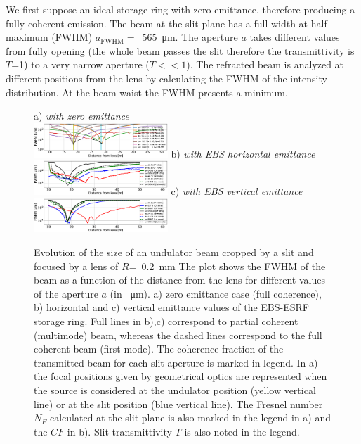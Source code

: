 \documentclass[9pt,twocolumn,twoside]{osajnl}
\begin{document}
We first suppose an ideal storage ring with zero emittance, therefore producing a fully coherent emission.  The beam at the slit plane has a full-width at half-maximum (FWHM) $a_\text{FWHM}=$~\SI{565}{\micro\meter}. The aperture $a$ takes different values from fully opening (the whole beam passes the slit therefore the transmittivity is $T$=1) to a very narrow aperture ($T << 1$). The refracted beam is analyzed at different positions from the lens by calculating the FWHM of the intensity distribution. At the beam waist the FWHM presents a minimum. 

\begin{figure}[htbp]
\centering
\flushleft a) {\it with zero emittance}\\ \centering
\includegraphics[width=0.45\textwidth]{figures/oneTF_UndSource_RectSlit_R200um.eps}
\flushleft b) {\it with EBS horizontal emittance}\\ \centering
\includegraphics[width=0.45\textwidth]{figures/oneTF_UndSource_RectSlit_R200um_PartialCoherence_h.eps}
\flushleft c) {\it with EBS vertical emittance}\\ \centering
\includegraphics[width=0.45\textwidth]{figures/oneTF_UndSource_RectSlit_R200um_PartialCoherence_v.eps}

\caption{Evolution of the size of an undulator beam cropped by a slit and focused by a lens of $R$=~\SI{0.2}{\milli\meter} 
The plot shows the FWHM of the beam  as a function of the distance from the lens for different values of the aperture $a$ (in \SI{}{\micro\meter}). 
a) zero emittance case (full coherence), 
b) horizontal and c) vertical emittance values of the EBS-ESRF storage ring.
Full lines in b),c) correspond to partial coherent (multimode) beam, whereas the dashed lines correspond to the full coherent beam (first mode). The coherence fraction of the transmitted beam for each slit aperture is marked in legend.
In a) the focal positions given by geometrical optics are represented when the source is considered at the undulator position (yellow vertical line) or at the slit position (blue vertical line). The Fresnel number $N_F$ calculated at the slit plane is also marked in the legend in a) and the $CF$ in b). Slit transmittivity $T$ is also noted in the legend.
}
\label{fig:oneTFund}
\end{figure}
\end{document}
